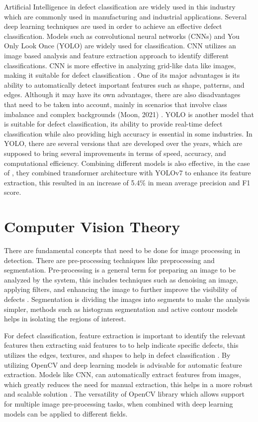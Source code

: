 Artificial Intelligence in defect classification are widely used in this industry which are commonly used in manufacturing and industrial applications. Several deep learning techniques are used in order to achieve an effective defect classification. Models such as convolutional neural networks (CNNs)  and You Only Look Once (YOLO) are widely used for classification. CNN utilizes an image based analysis and feature extraction approach to identify different classifications. CNN is more effective in analyzing grid-like data like images, making it suitable for defect classification \cite{Das_Hollander_Suliman_2019}. One of its major advantages is its ability to automatically detect important features such as shape, patterns, and edges. Although it may have its own advantages, there are also disadvantages that need to be taken into account, mainly in scenarios that involve class imbalance and complex backgrounds (Moon, 2021) . YOLO is another model that is suitable for defect classification, its ability to provide real-time defect classification while also providing high accuracy is essential in some industries. In YOLO, there are several versions that are developed over the years, which are supposed to bring several improvements in terms of speed, accuracy, and computational efficiency. Combining different models is also effective, in the case of \cite{Deepti_Prabadevi_2024}, they combined transformer architecture with YOLOv7 to enhance its feature extraction, this resulted in an increase of 5.4\% in mean average precision and F1 score. 

\section{Computer Vision Theory}

There are fundamental concepts that need to be done for image processing in detection. There are pre-processing techniques like preprocessing and segmentation. Pre-processing is a general term for preparing an image to be analyzed by the system, this includes techniques such as denoising an image, applying filters, and enhancing the image to further improve the visibility of defects \cite{Lee_Tai_2020} . Segmentation is dividing the images into segments to make the analysis simpler, methods such as histogram segmentation and active contour models helps in isolating the regions of interest. 

For defect classification, feature extraction is important to identify the relevant features then extracting said features to to help indicate specific defects, this utilizes the edges, textures, and shapes to help in defect classification \cite{Wu_Hao_Song_2024}.  By utilizing OpenCV and deep learning models is advisable for automatic feature extraction. Models like CNN, can automatically extract features from images, which greatly reduces the need for manual extraction, this helps in a more robust and scalable solution \cite{Bali_Tyagi_2020}. The versatility of OpenCV library which allows support for multiple image pre-processing tasks, when combined with deep learning models can be applied to different fields. 

